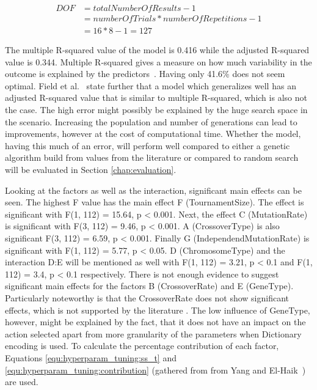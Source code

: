 \begin{equation}
	\begin{split}
		DOF & = totalNumberOfResults - 1 \\
		& = numberOfTrials * numberOfRepetitions - 1 \\
		& = 16 * 8 - 1 = 127
	\end{split}
	\label{equ:hyperparam_tuning:full_DOF}
\end{equation}

The multiple R-squared value of the model is 0.416 while the adjusted R-squared value is 0.344. Multiple R-squared gives a measure on how much variability in the outcome is explained by the predictors~\cite{field_discovering_2012}. Having only 41.6\% does not seem optimal. Field et al.~\cite{field_discovering_2012} state further that a model which generalizes well has an adjusted R-squared value that is similar to multiple R-squared, which is also not the case. The high error might possibly be explained by the huge search space in the scenario. Increasing the population and number of generations can lead to improvements, however at the cost of computational time. Whether the model, having this much of an error, will perform well compared to either a genetic algorithm build from values from the literature or compared to random search will be evaluated in Section \ref{chap:evaluation}.

Looking at the factors as well as the interaction, significant main effects can be seen. The highest F value has the main effect F (TournamentSize). The effect is significant with F(1, 112) = 15.64, p < 0.001. Next, the effect C (MutationRate) is significant with F(3, 112) = 9.46, p < 0.001. A (CrossoverType) is also significant F(3, 112) = 6.59, p < 0.001. Finally G (IndependendMutationRate) is significant with F(1, 112) = 5.77, p < 0.05.
D (ChromosomeType) and the interaction D:E will be mentioned as well with F(1, 112) = 3.21, p < 0.1 and F(1, 112) = 3.4, p < 0.1 respectively. There is not enough evidence to suggest significant main effects for the factors B (CrossoverRate) and E (GeneType). Particularly noteworthy is that the CrossoverRate does not show significant effects, which is not supported by the literature . The low influence of GeneType, however, might be explained by the fact, that it does not have an impact on the action selected apart from more granularity of the parameters when Dictionary encoding is used. To calculate the percentage contribution of each factor, Equations \ref{equ:hyperparam_tuning:ss_t} and \ref{equ:hyperparam_tuning:contribution} (gathered from from Yang and El-Haik~\cite{yang_design_2009}) are used.

